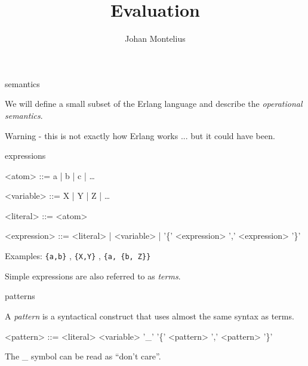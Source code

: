 

\title[ID1019 Evaluation]{Evaluation}


\author{Johan Montelius}
\date{\semester}



\begin{frame}
\titlepage
\end{frame}

\begin{frame}{semantics}

We will define a small subset of the Erlang language and describe the
{\em operational semantics}.


\pause \vspace{40pt}Warning - this is not exactly how Erlang works ... but it could have been.

\end{frame}


\begin{frame}{expressions}

\begin{grammar}
<atom> ::= a | b | c | \ldots

<variable> ::= X | Y | Z | \ldots

<literal> ::= <atom>

<expression> ::= <literal> | <variable> |  '\{' <expression> ',' <expression> '\}'
\end{grammar}


\pause \vspace{20pt} Examples: {\tt \{a,b\}} , {\tt \{X,Y\}} , {\tt \{a, \{b, Z\}\}}

\pause \vspace{20pt} Simple expressions are also referred to as {\em terms}.
\end{frame}

\begin{frame}{patterns}

  A {\em pattern} is a syntactical construct that uses almost the same
  syntax as terms.

  \pause
  \vspace{20pt}

\begin{grammar}
<pattern> ::= <literal> 
      \alt <variable> 
      \alt '\_' 
      \alt '\{' <pattern> ',' <pattern> '\}'
\end{grammar}

 \pause \vspace{20pt}
  The \_ symbol can be read as ``don't care''.

\end{frame}





